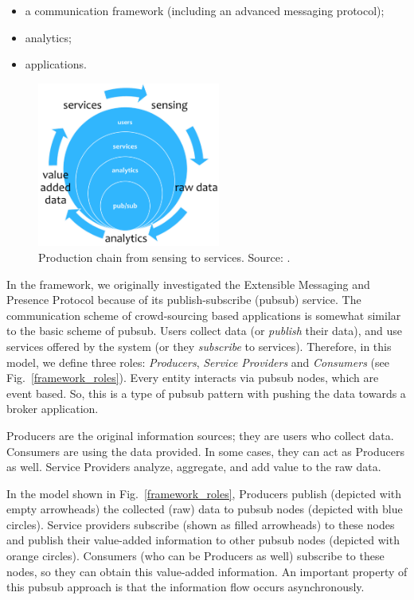 \documentclass[b5paper,12pt]{report}
\theoremstyle{definition}
\begin{document}
\begin{itemize}
\item a communication framework (including an advanced messaging protocol);
\item analytics;
\item applications.
\end{itemize}

\begin{figure}[ht!]
\centerline{
\includegraphics[width=6cm]{img/framework_layers.png}}
\caption{Production chain from sensing to services. Source: \cite{szabo2013framework}.}
\label{framework_layers}
\end{figure}

In the framework, we originally investigated the Extensible Messaging and Presence Protocol \cite{saint2011extensible} because of its publish-subscribe (pubsub) \cite{millard2010xep} service. The communication scheme of crowd-sourcing based applications is somewhat similar to the basic scheme of pubsub. Users collect data (or \textit{publish} their data), and use services offered by the system (or they \textit{subscribe} to services). Therefore, in this model, we define three roles: \textit{Producers}, \textit{Service Providers} and \textit{Consumers} (see Fig.~\ref{framework_roles}). Every entity interacts via pubsub nodes, which are event based. So, this is a type of pubsub pattern with pushing the data towards a broker application.

Producers are the original information sources; they are users who collect data. Consumers are using the data provided. In some cases, they can act as Producers as well. Service Providers analyze, aggregate, and add value to the raw data.

In the model shown in Fig.~\ref{framework_roles}, Producers publish (depicted with empty arrowheads) the collected (raw) data to pubsub nodes (depicted with blue circles). Service providers subscribe (shown as filled arrowheads) to these nodes and publish their value-added information to other pubsub nodes (depicted with orange circles). Consumers (who can be Producers as well) subscribe to these nodes, so they can obtain this value-added information. An important property of this pubsub approach is that the information flow occurs asynchronously.
\end{document}
